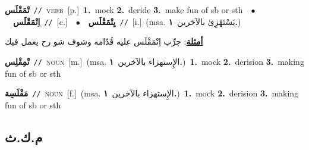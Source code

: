 \documentclass[10pt,a4paper,twoside]{article} %
\begin{document}
\begin{multicols}{2}
{\setlength\topsep{0pt}\textbf{\foreignlanguage{arabic}{تْمَقْلَس}}\ {\color{gray}\texttt{//}\color{black}}\ \textsc{verb}\ [p.]\ \textbf{1.}~mock  \textbf{2.}~deride  \textbf{3.}~make fun of sb or sth\ \ $\bullet$\ \ \setlength\topsep{0pt}\textbf{\foreignlanguage{arabic}{اِتْمَقْلَس}}\ {\color{gray}\texttt{//}\color{black}}\ [c.]\ \ $\bullet$\ \ \setlength\topsep{0pt}\textbf{\foreignlanguage{arabic}{يِتْمَقْلَس}}\ {\color{gray}\texttt{//}\color{black}}\ [i.]\ \color{gray}(msa. \foreignlanguage{arabic}{يَسْتَهْزِئ بالآخرين}~\foreignlanguage{arabic}{\textbf{١.}})\color{black}\  \begin{flushright}\color{gray}\foreignlanguage{arabic}{\textbf{\underline{\foreignlanguage{arabic}{أمثلة}}}: جرِّب اِتْمَقْلَس عليه قُدّامه وشوف شو رح يعمل فيك}\end{flushright}\color{black}} \vspace{2mm}

{\setlength\topsep{0pt}\textbf{\foreignlanguage{arabic}{تْمِقْلِس}}\ {\color{gray}\texttt{//}\color{black}}\ \textsc{noun}\ [m.]\ \color{gray}(msa. \foreignlanguage{arabic}{الإِستهزاء بالآخرين}~\foreignlanguage{arabic}{\textbf{١.}})\color{black}\ \textbf{1.}~mock  \textbf{2.}~derision  \textbf{3.}~making fun of sb or sth\ } \vspace{2mm}

{\setlength\topsep{0pt}\textbf{\foreignlanguage{arabic}{مَقْلَسِة}}\ {\color{gray}\texttt{//}\color{black}}\ \textsc{noun}\ [f.]\ \color{gray}(msa. \foreignlanguage{arabic}{الإِستهزاء بالآخرين}~\foreignlanguage{arabic}{\textbf{١.}})\color{black}\ \textbf{1.}~mock  \textbf{2.}~derision  \textbf{3.}~making fun of sb or sth\ } \vspace{2mm}

\vspace{-3mm}
\subsection*{\color{blue}\foreignlanguage{arabic}{م.ك.ث}\color{blue}{}} 


\end{multicols}
\end{document}
